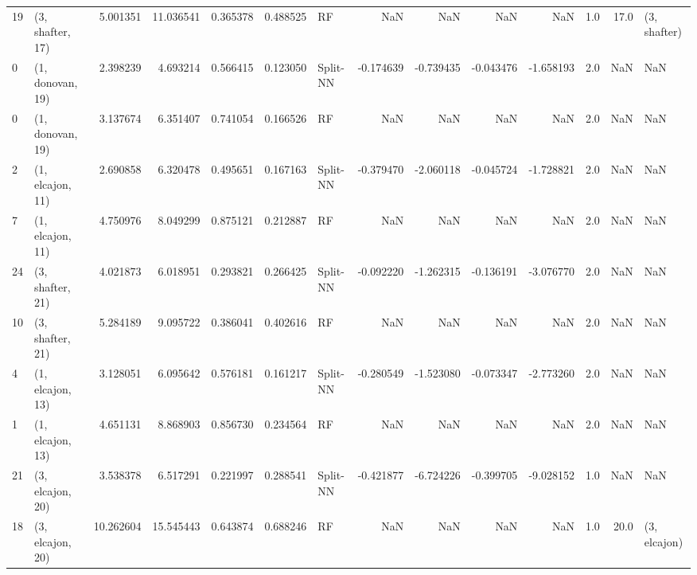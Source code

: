 \begin{tabular}{llrrrrlrrrrrrl}
19 &  (3, shafter, 17) &   5.001351 &  11.036541 &   0.365378 &  0.488525 &          RF &             NaN &           NaN &            NaN &          NaN &            1.0 &   17.0 &     (3, shafter) \\
0  &  (1, donovan, 19) &   2.398239 &   4.693214 &   0.566415 &  0.123050 &    Split-NN &       -0.174639 &     -0.739435 &      -0.043476 &    -1.658193 &            2.0 &    NaN &              NaN \\
0  &  (1, donovan, 19) &   3.137674 &   6.351407 &   0.741054 &  0.166526 &          RF &             NaN &           NaN &            NaN &          NaN &            2.0 &    NaN &              NaN \\
2  &  (1, elcajon, 11) &   2.690858 &   6.320478 &   0.495651 &  0.167163 &    Split-NN &       -0.379470 &     -2.060118 &      -0.045724 &    -1.728821 &            2.0 &    NaN &              NaN \\
7  &  (1, elcajon, 11) &   4.750976 &   8.049299 &   0.875121 &  0.212887 &          RF &             NaN &           NaN &            NaN &          NaN &            2.0 &    NaN &              NaN \\
24 &  (3, shafter, 21) &   4.021873 &   6.018951 &   0.293821 &  0.266425 &    Split-NN &       -0.092220 &     -1.262315 &      -0.136191 &    -3.076770 &            2.0 &    NaN &              NaN \\
10 &  (3, shafter, 21) &   5.284189 &   9.095722 &   0.386041 &  0.402616 &          RF &             NaN &           NaN &            NaN &          NaN &            2.0 &    NaN &              NaN \\
4  &  (1, elcajon, 13) &   3.128051 &   6.095642 &   0.576181 &  0.161217 &    Split-NN &       -0.280549 &     -1.523080 &      -0.073347 &    -2.773260 &            2.0 &    NaN &              NaN \\
1  &  (1, elcajon, 13) &   4.651131 &   8.868903 &   0.856730 &  0.234564 &          RF &             NaN &           NaN &            NaN &          NaN &            2.0 &    NaN &              NaN \\
21 &  (3, elcajon, 20) &   3.538378 &   6.517291 &   0.221997 &  0.288541 &    Split-NN &       -0.421877 &     -6.724226 &      -0.399705 &    -9.028152 &            1.0 &    NaN &              NaN \\
18 &  (3, elcajon, 20) &  10.262604 &  15.545443 &   0.643874 &  0.688246 &          RF &             NaN &           NaN &            NaN &          NaN &            1.0 &   20.0 &     (3, elcajon) \\

\end{tabular}
